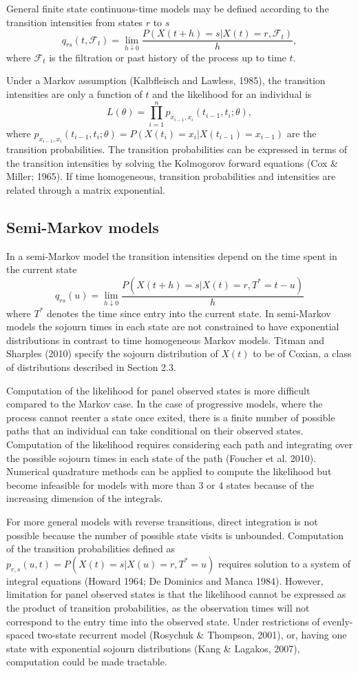 \documentclass{uwstat572}
\begin{document}
General finite state continuous-time models may be defined according to the transition intensities from states $r$ to $s$
\[
q_{rs}(t,\mathcal{F}_t) =\lim_{h \downarrow 0} \frac{P(X(t+h)=s|X(t) = r, \mathcal{F}_t)}{h},
\]
where $\mathcal{F}_t$ is the filtration or past history of the process up to time $t$.

Under a Markov assumption (Kalbfleisch and Lawless, 1985), the transition intensities are only a function of $t$ and the likelihood for an individual is
\[
L(\theta) = \prod_{i=1}^n p_{x_{i-1},x_i} (t_{i-1},t_i;\theta),
\]
where $p_{x_{i-1},x_i} (t_{i-1},t_i;\theta)=P(X(t_i)=x_i | X(t_{i-1})=x_{i-1})$ are the transition probabilities. The transition probabilities can be expressed in terms of the transition intensities by solving the Kolmogorov forward equations (Cox \& Miller; 1965). If time homogeneous, transition probabilities and intensities are related through a matrix exponential.

\subsection{Semi-Markov models}
In a semi-Markov model the transition intensities depend on the time spent in the current state
\[
q_{rs} (u) = \lim_{h \downarrow 0} \frac{P(X(t+h) = s | X(t) = r, T^* = t-u)}{h}
\]
where $T^*$ denotes the time since entry into the current state. In semi-Markov models the sojourn times in each state are not constrained to have exponential distributions in contrast to time homogeneous Markov models. Titman and Sharples (2010) specify the sojourn distribution of $X(t)$ to be of Coxian, a class of distributions described in Section 2.3.

Computation of the likelihood for panel observed states is more difficult compared to the Markov case. In the case of progressive models, where the process cannot reenter a state once exited, there is a finite number of possible paths that an individual can take conditional on their observed states. Computation of the likelihood requires considering each path and integrating over the possible sojourn times in each state of the path (Foucher et al. 2010). Numerical quadrature methods can be applied to compute the likelihood but become infeasible for models with more than $3$ or $4$ states because of the increasing dimension of the integrals.

For more general models with reverse transitions, direct integration is not possible because the number of possible state visits is unbounded. Computation of the transition probabilities defined as $p_{r,s}(u, t ) = P (X (t ) = s|X(u) = r, T^* = u)$ requires solution to a system of integral equations (Howard 1964; De Dominics and Manca 1984). However, limitation for panel observed states is that the likelihood cannot be expressed as the product of transition probabilities, as the observation times will not correspond to the entry time into the observed state. Under restrictions of evenly-spaced two-state recurrent model (Rosychuk \& Thompson, 2001), or, having one state with exponential sojourn distributions (Kang \& Lagakos, 2007), computation could be made tractable.
\end{document}
